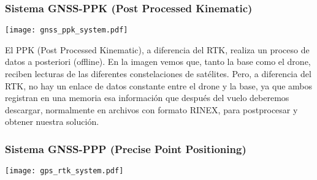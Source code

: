 \begin{frame}
    \frametitle{Sistema GNSS-PPK (Post Processed Kinematic)}
    \begin{center}
        \texttt{[image: gnss\_ppk\_system.pdf]}
    \end{center}

    El PPK (Post Processed Kinematic), a diferencia del RTK, realiza un proceso de datos a posteriori (offline).
    En la imagen vemos que, tanto la base como el drone, reciben lecturas de las diferentes constelaciones de satélites. Pero, a diferencia del RTK, no hay un enlace de datos constante entre el drone y la base, ya que ambos registran en una memoria esa información que después del vuelo deberemos descargar, normalmente en archivos con formato RINEX, para postprocesar y obtener nuestra solución.
    
\end{frame}

\begin{frame}
    \frametitle{Sistema GNSS-PPP (Precise Point Positioning)}
    \begin{center}
        \texttt{[image: gps\_rtk\_system.pdf]}
    \end{center}

\end{frame}